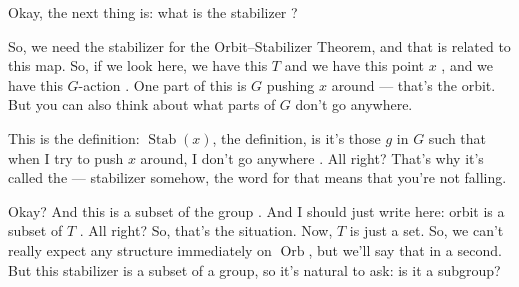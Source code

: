 \begin{speech}[00:17:15 - 00:18:47]
Okay, the next thing is: what is the stabilizer ?

So, we need the stabilizer for the Orbit--Stabilizer Theorem, and that is related to this map. So, if we look here, we have this $T$ and we have this point $x$ , and we have this $G$-action . One part of this is $G$ pushing $x$ around --- that's the orbit. But you can also think about what parts of $G$ don't go anywhere.

This is the definition: $\operatorname{Stab}(x)$, the definition, is it's those $g$ in $G$ such that when I try to push $x$ around, I don't go anywhere . All right? That's why it's called the  --- stabilizer somehow, the word for that means that you're not falling.

Okay? And this is a subset of the group . And I should just write here: orbit is a subset of $T$ . All right? So, that's the situation. Now, $T$ is just a set. So, we can't really expect any structure immediately on $\operatorname{Orb}$, but we'll say that in a second. But this stabilizer is a subset of a group, so it's natural to ask: is it a subgroup?
\end{speech}

